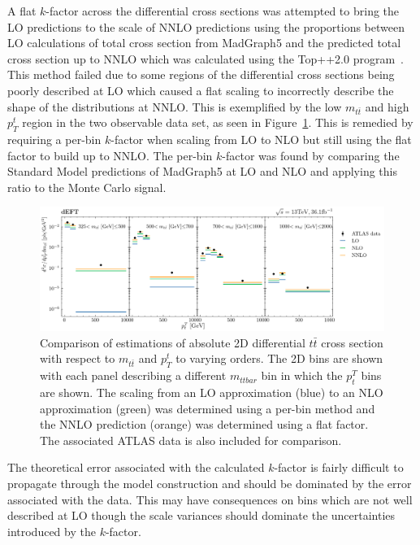 \documentclass[a4paper,11pt]{article}
\begin{document}
A flat $k$-factor across the differential cross sections was attempted to bring the LO predictions to the scale of NNLO predictions using the proportions between LO calculations of total cross section from MadGraph5 and the predicted total cross section up to NNLO which was calculated using the Top++2.0 program~\cite{Czakon:2011xx}.
This method failed due to some regions of the differential cross sections being poorly described at LO which caused a flat scaling to incorrectly describe the shape of the distributions at NNLO.
This is exemplified by the low $m_{t\bar{t}}$ and high $p_{T}^{t}$ region in the two observable data set, as seen in Figure~\ref{fig:kfactor}.
This is remedied by requiring a per-bin $k$-factor when scaling from LO to NLO but still using the flat factor to build up to NNLO.
The per-bin $k$-factor was found by comparing the Standard Model predictions of MadGraph5 at LO and NLO and applying this ratio to the Monte Carlo signal.

\begin{figure}[H]
    \centering
    \includegraphics[width=\textwidth]{plots/k_factor.png}
    \caption{Comparison of estimations of absolute 2D differential $t\bar{t}$ cross section with respect to $m_{t\bar{t}}$ and $p_{T}^{t}$ to varying orders. The 2D bins are shown with each panel describing a different $m_{ttbar}$ bin in which the $p_{t}^{T}$ bins are shown. The scaling from an LO approximation (blue) to an NLO approximation (green) was determined using a per-bin method and the NNLO prediction (orange) was determined using a flat factor. The associated ATLAS data is also included for comparison.}
    \label{fig:kfactor}
\end{figure}

The theoretical error associated with the calculated $k$-factor is fairly difficult to propagate through the model construction and should be dominated by the error associated with the data.
This may have consequences on bins which are not well described at LO though the scale variances should dominate the uncertainties introduced by the $k$-factor.
\end{document}
